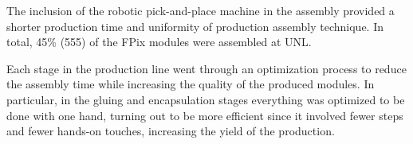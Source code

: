 The inclusion of the robotic pick-and-place machine in the assembly provided a shorter production time and uniformity of production assembly technique. In total, 45\% (555) of the FPix modules were assembled at UNL.  

Each stage in the production line went through an optimization process to reduce the assembly time while increasing the quality of the produced modules. In particular, in the gluing and encapsulation stages everything was optimized to be done with one hand, turning out to be more efficient since it involved fewer steps and fewer hands-on touches, increasing the yield of the production.

